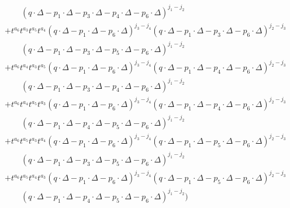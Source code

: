 \documentclass[12pt]{article}
\renewcommand{\theequation}{\thesection.\arabic{equation}}
\begin{document}
\begin{eqnarray}
    \nonumber
    \\
    &&\qquad (q\cdot \Delta-p_1\cdot \Delta-p_3\cdot \Delta-p_4\cdot \Delta-p_6\cdot \Delta)^{j_1-j_2}
    \nonumber
    \\
    &&
+ t^{a_6} t^{a_3} t^{a_5} t^{a_4} 
    (q\cdot \Delta-p_1\cdot \Delta-p_6\cdot \Delta)^{j_3-j_4} (q\cdot \Delta-p_1\cdot \Delta-p_3\cdot \Delta-p_6\cdot \Delta)^{j_2-j_3} 
    \nonumber
    \\
    &&\qquad (q\cdot \Delta-p_1\cdot \Delta-p_3\cdot \Delta-p_5\cdot \Delta-p_6\cdot \Delta)^{j_1-j_2}
    \nonumber
    \\
    &&
+ t^{a_6} t^{a_4} t^{a_3} t^{a_5} 
    (q\cdot \Delta-p_1\cdot \Delta-p_6\cdot \Delta)^{j_3-j_4} (q\cdot \Delta-p_1\cdot \Delta-p_4\cdot \Delta-p_6\cdot \Delta)^{j_2-j_3} 
    \nonumber
    \\
    &&\qquad (q\cdot \Delta-p_1\cdot \Delta-p_3\cdot \Delta-p_4\cdot \Delta-p_6\cdot \Delta)^{j_1-j_2}
    \nonumber
    \\
    &&
+ t^{a_6} t^{a_4} t^{a_5} t^{a_3} 
    (q\cdot \Delta-p_1\cdot \Delta-p_6\cdot \Delta)^{j_3-j_4} (q\cdot \Delta-p_1\cdot \Delta-p_4\cdot \Delta-p_6\cdot \Delta)^{j_2-j_3} 
    \nonumber
    \\
    &&\qquad (q\cdot \Delta-p_1\cdot \Delta-p_4\cdot \Delta-p_5\cdot \Delta-p_6\cdot \Delta)^{j_1-j_2}
    \nonumber
    \\
    &&
+ t^{a_6} t^{a_5} t^{a_3} t^{a_4} 
    (q\cdot \Delta-p_1\cdot \Delta-p_6\cdot \Delta)^{j_3-j_4} (q\cdot \Delta-p_1\cdot \Delta-p_5\cdot \Delta-p_6\cdot \Delta)^{j_2-j_3} 
    \nonumber
    \\
    &&\qquad (q\cdot \Delta-p_1\cdot \Delta-p_3\cdot \Delta-p_5\cdot \Delta-p_6\cdot \Delta)^{j_1-j_2}
    \nonumber
    \\
    &&
+ t^{a_6} t^{a_5} t^{a_4} t^{a_3} 
    (q\cdot \Delta-p_1\cdot \Delta-p_6\cdot \Delta)^{j_3-j_4} (q\cdot \Delta-p_1\cdot \Delta-p_5\cdot \Delta-p_6\cdot \Delta)^{j_2-j_3} 
    \nonumber
    \\
    &&\qquad (q\cdot \Delta-p_1\cdot \Delta-p_4\cdot \Delta-p_5\cdot \Delta-p_6\cdot \Delta)^{j_1-j_2} 
    \biggr)
\end{eqnarray}

\renewcommand{\theequation}{\ref{sec:appB}.\arabic{equation}}
\setcounter{equation}{0}
\renewcommand{\thefigure}{\ref{sec:appB}.\arabic{figure}}
\setcounter{figure}{0}
\renewcommand{\thetable}{\ref{sec:appB}.\arabic{table}}
\setcounter{table}{0}

\vspace*{-2mm}
\end{document}

